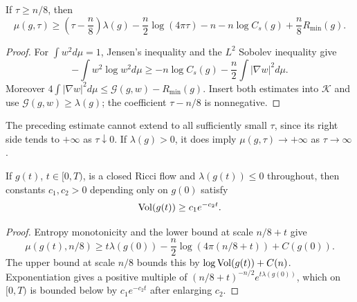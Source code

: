 \begin{lemma}
\label{lem:chow-iii-ch17-mu-lower-lambda}
If $\tau\ge n/8$, then
\[
 \mu(g,\tau)\ge\left(\tau-\frac n8\right)\lambda(g)
 -\frac n2\log(4\pi\tau)-n-n\log C_s(g)+\frac n8R_{\min}(g).
\]
\end{lemma}
\begin{proof}
For $\int w^2d\mu=1$, Jensen's inequality and the $L^2$ Sobolev inequality
give
\[
 -\int w^2\log w^2d\mu\ge-n\log C_s(g)
 -\frac n2\int|\nabla w|^2d\mu.
\]
Moreover
$4\int|\nabla w|^2d\mu\le\mathcal G(g,w)-R_{\min}(g)$.
Insert both estimates into $\mathcal K$ and use
$\mathcal G(g,w)\ge\lambda(g)$; the coefficient $\tau-n/8$ is
nonnegative.
\end{proof}

\begin{remark}
\label{rem:chow-iii-ch17-mu-lower-bound-scales}
The preceding estimate cannot extend to all sufficiently small $\tau$, since
its right side tends to $+\infty$ as $\tau\downarrow0$.  If
$\lambda(g)>0$, it does imply $\mu(g,\tau)\to+\infty$ as
$\tau\to\infty$.
\end{remark}

\begin{lemma}
\label{lem:chow-iii-ch17-volume-lower-nonpositive-lambda}
If $g(t)$, $t\in[0,T)$, is a closed Ricci flow and
$\lambda(g(t))\le0$ throughout, then constants $c_1,c_2>0$ depending only
on $g(0)$ satisfy
\[
 \operatorname{Vol}(g(t))\ge c_1e^{-c_2t}.
\]
\end{lemma}
\begin{proof}
Entropy monotonicity and the lower bound at scale $n/8+t$ give
\[
 \mu(g(t),n/8)\ge t\lambda(g(0))
 -\frac n2\log(4\pi(n/8+t))+C(g(0)).
\]
The upper bound at scale $n/8$ bounds this by
$\log\operatorname{Vol}(g(t))+C(n)$.  Exponentiation gives a positive multiple of
$(n/8+t)^{-n/2}e^{t\lambda(g(0))}$, which on $[0,T)$ is bounded below by
$c_1e^{-c_2t}$ after enlarging $c_2$.
\end{proof}


